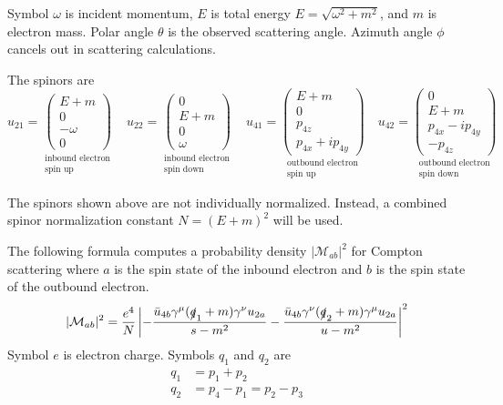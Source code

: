 \documentclass[12pt]{article}
\begin{document}
\noindent
Symbol $\omega$ is incident momentum,
$E$ is total energy $E=\sqrt{\omega^2+m^2}$,
and $m$ is electron mass.
Polar angle $\theta$ is the observed scattering angle.
Azimuth angle $\phi$ cancels out in scattering calculations.

\bigskip
\noindent
The spinors are
\begin{equation*}
u_{21}=
\underset{\substack{\text{inbound electron}\\\text{spin up}}}
{
\begin{pmatrix}
E+m\\
0\\
-\omega\\
0
\end{pmatrix}
}
\quad
u_{22}=
\underset{\substack{\text{inbound electron}\\\text{spin down}}}
{
\begin{pmatrix}
0\\
E+m\\
0\\
\omega
\end{pmatrix}
}
\quad
u_{41}=
\underset{\substack{\text{outbound electron}\\\text{spin up}}}
{
\begin{pmatrix}
E+m\\
0\\
p_{4z}\\
p_{4x}+ip_{4y}
\end{pmatrix}
}
\quad
u_{42}=
\underset{\substack{\text{outbound electron}\\\text{spin down}}}
{
\begin{pmatrix}
0\\
E+m\\
p_{4x}-ip_{4y}\\
-p_{4z}
\end{pmatrix}
}
\end{equation*}

\noindent
The spinors shown above are not individually normalized.
Instead, a combined spinor normalization constant $N=(E+m)^2$ will be used.

\bigskip
\noindent
The following formula computes a probability density $|\mathcal{M}_{ab}|^2$
for Compton scattering where $a$ is the spin state of the inbound electron
and $b$ is the spin state of the outbound electron.
\begin{equation*}
|\mathcal{M}_{ab}|^2
=
\frac{e^4}{N}
\left|
-\frac{\bar{u}_{4b}\gamma^\mu(\slashed{q}_1+m)\gamma^\nu u_{2a}}{s-m^2}
-\frac{\bar{u}_{4b}\gamma^\nu(\slashed{q}_2+m)\gamma^\mu u_{2a}}{u-m^2}
\right|^2
\end{equation*}
Symbol $e$ is electron charge.
Symbols $q_1$ and $q_2$ are
\begin{align*}
q_1&=p_1+p_2
\\
q_2&=p_4-p_1=p_2-p_3
\end{align*}
\end{document}
